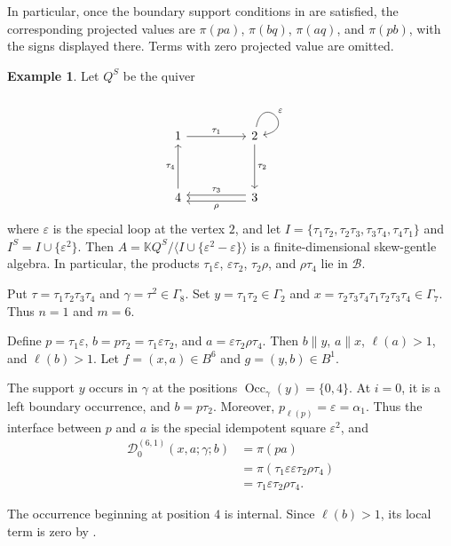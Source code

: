 \documentclass[11pt,a4paper,reqno]{amsart}
\newcommand{\mK}{\mathbb K}
\newcommand{\mB}{\mathcal B}
\newcommand{\mD}{\mathcal D}
\newcommand{\Occ}{\operatorname{Occ}}
\newcommand{\para}[2]{(#1,#2)}
\newcommand{\ep}{\varepsilon}
\theoremstyle{plain}
\theoremstyle{definition}
\newtheorem{example}[example]{Example}
\numberwithin{equation}{section}
\begin{document}
	In particular, once the boundary support conditions in
	 are satisfied, the corresponding
	projected values are $\pi(pa)$, $\pi(bq)$, $\pi(aq)$, and
	$\pi(pb)$, with the signs displayed there.  Terms with zero projected value are omitted.
	\begin{example}
		\label{ex:cycle-power-long-value-absorption}
		Let $Q^S$ be the quiver
		\[\begin{tikzcd}
			1 && 2 \\
			\\
			4 && 3
			\arrow["{\tau_1}", from=1-1, to=1-3]
			\arrow["\ep", from=1-3, to=1-3, loop, in=10, out=80, distance=10mm]
			\arrow["{\tau_2}", from=1-3, to=3-3]
			\arrow["{\tau_4}", from=3-1, to=1-1]
			\arrow["{\tau_3}"', shift right, from=3-3, to=3-1]
			\arrow["\rho", shift left, from=3-3, to=3-1]
		\end{tikzcd}\]
		where $\ep$ is the special loop at the vertex $2$, and let
		$I=\{\tau_1\tau_2, \tau_2\tau_3, \tau_3\tau_4, \tau_4\tau_1\}$
		and $I^S=I\cup\{\ep^2\}$.
		Then
		$A= \mK Q^S/ \langle I\cup\{\ep^2-\ep\} \rangle$
		is a finite-dimensional skew-gentle algebra.  In particular, the products
		$\tau_1\ep$, $\ep\tau_2$, $\tau_2\rho$, and $\rho\tau_4$ lie in $\mB$.
		
		Put
		$\tau=\tau_1\tau_2\tau_3\tau_4$
		and
		$\gamma=\tau^2\in\Gamma_8$.
		Set
		$y=\tau_1\tau_2\in\Gamma_2$
		and
		$x= \tau_2\tau_3\tau_4 \tau_1\tau_2\tau_3\tau_4 \in\Gamma_7$.
		Thus $n=1$ and $m=6$.
		
		Define $p=\tau_1\ep$, $b=p\tau_2=\tau_1\ep\tau_2$, and
		$a=\ep\tau_2\rho\tau_4$.
		Then $b\parallel y$, $a\parallel x$, $\ell(a)>1$, and
		$\ell(b)>1$.
		Let $f=\para{x}{a}\in B^6$ and $g=\para{y}{b}\in B^1$.
		
		The support $y$ occurs in $\gamma$ at the positions
		$\Occ_\gamma(y)=\{0,4\}$.
		At $i=0$, it is a left boundary occurrence, and
		$b=p\tau_2$.
		Moreover,
		$p_{\ell(p)}=\ep=\alpha_1$.
		Thus the interface between $p$ and $a$ is the special idempotent
		square $\ep^2$, and
		\begin{align*}
			\mD_0^{(6,1)}(x,a;\gamma;b)
			&=
			\pi(pa)
			\\
			&=
			\pi(
			\tau_1\ep\ep\tau_2\rho\tau_4
			)
			\\
			&=
			\tau_1\ep\tau_2\rho\tau_4.
		\end{align*}
		
		The occurrence beginning at position $4$ is internal.  Since
		$\ell(b)>1$, its local term is zero by
		.
		

\end{example}
\end{document}
